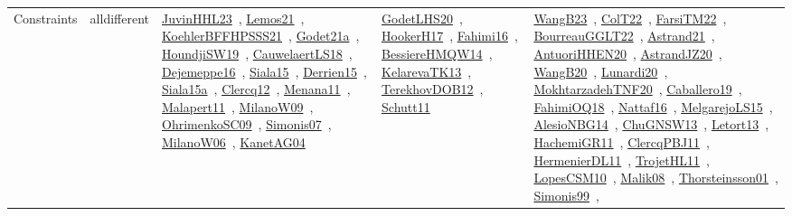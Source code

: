 {\begin{longtable}{lp{3cm}>{\raggedright\arraybackslash}p{6cm}>{\raggedright\arraybackslash}p{6cm}>{\raggedright\arraybackslash}p{8cm}}
Constraints & alldifferent & \href{../works/JuvinHHL23.pdf}{JuvinHHL23}~\cite{JuvinHHL23}, \href{../works/Lemos21.pdf}{Lemos21}~\cite{Lemos21}, \href{../works/KoehlerBFFHPSSS21.pdf}{KoehlerBFFHPSSS21}~\cite{KoehlerBFFHPSSS21}, \href{../works/Godet21a.pdf}{Godet21a}~\cite{Godet21a}, \href{../works/HoundjiSW19.pdf}{HoundjiSW19}~\cite{HoundjiSW19}, \href{../works/CauwelaertLS18.pdf}{CauwelaertLS18}~\cite{CauwelaertLS18}, \href{../works/Dejemeppe16.pdf}{Dejemeppe16}~\cite{Dejemeppe16}, \href{../works/Siala15.pdf}{Siala15}~\cite{Siala15}, \href{../works/Derrien15.pdf}{Derrien15}~\cite{Derrien15}, \href{../works/Siala15a.pdf}{Siala15a}~\cite{Siala15a}, \href{../works/Clercq12.pdf}{Clercq12}~\cite{Clercq12}, \href{../works/Menana11.pdf}{Menana11}~\cite{Menana11}, \href{../works/Malapert11.pdf}{Malapert11}~\cite{Malapert11}, \href{../works/MilanoW09.pdf}{MilanoW09}~\cite{MilanoW09}, \href{../works/OhrimenkoSC09.pdf}{OhrimenkoSC09}~\cite{OhrimenkoSC09}, \href{../works/Simonis07.pdf}{Simonis07}~\cite{Simonis07}, \href{../works/MilanoW06.pdf}{MilanoW06}~\cite{MilanoW06}, \href{../works/KanetAG04.pdf}{KanetAG04}~\cite{KanetAG04} & \href{../works/GodetLHS20.pdf}{GodetLHS20}~\cite{GodetLHS20}, \href{../works/HookerH17.pdf}{HookerH17}~\cite{HookerH17}, \href{../works/Fahimi16.pdf}{Fahimi16}~\cite{Fahimi16}, \href{../works/BessiereHMQW14.pdf}{BessiereHMQW14}~\cite{BessiereHMQW14}, \href{../works/KelarevaTK13.pdf}{KelarevaTK13}~\cite{KelarevaTK13}, \href{../works/TerekhovDOB12.pdf}{TerekhovDOB12}~\cite{TerekhovDOB12}, \href{../works/Schutt11.pdf}{Schutt11}~\cite{Schutt11} & \href{../works/WangB23.pdf}{WangB23}~\cite{WangB23}, \href{../works/ColT22.pdf}{ColT22}~\cite{ColT22}, \href{../works/FarsiTM22.pdf}{FarsiTM22}~\cite{FarsiTM22}, \href{../works/BourreauGGLT22.pdf}{BourreauGGLT22}~\cite{BourreauGGLT22}, \href{../works/Astrand21.pdf}{Astrand21}~\cite{Astrand21}, \href{../works/AntuoriHHEN20.pdf}{AntuoriHHEN20}~\cite{AntuoriHHEN20}, \href{../works/AstrandJZ20.pdf}{AstrandJZ20}~\cite{AstrandJZ20}, \href{../works/WangB20.pdf}{WangB20}~\cite{WangB20}, \href{../works/Lunardi20.pdf}{Lunardi20}~\cite{Lunardi20}, \href{../works/MokhtarzadehTNF20.pdf}{MokhtarzadehTNF20}~\cite{MokhtarzadehTNF20}, \href{../works/Caballero19.pdf}{Caballero19}~\cite{Caballero19}, \href{../works/FahimiOQ18.pdf}{FahimiOQ18}~\cite{FahimiOQ18}, \href{../works/Nattaf16.pdf}{Nattaf16}~\cite{Nattaf16}, \href{../works/MelgarejoLS15.pdf}{MelgarejoLS15}~\cite{MelgarejoLS15}, \href{../works/AlesioNBG14.pdf}{AlesioNBG14}~\cite{AlesioNBG14}, \href{../works/ChuGNSW13.pdf}{ChuGNSW13}~\cite{ChuGNSW13}, \href{../works/Letort13.pdf}{Letort13}~\cite{Letort13}, \href{../works/HachemiGR11.pdf}{HachemiGR11}~\cite{HachemiGR11}, \href{../works/ClercqPBJ11.pdf}{ClercqPBJ11}~\cite{ClercqPBJ11}, \href{../works/HermenierDL11.pdf}{HermenierDL11}~\cite{HermenierDL11}, \href{../works/TrojetHL11.pdf}{TrojetHL11}~\cite{TrojetHL11}, \href{../works/LopesCSM10.pdf}{LopesCSM10}~\cite{LopesCSM10}, \href{../works/Malik08.pdf}{Malik08}~\cite{Malik08}, \href{../works/Thorsteinsson01.pdf}{Thorsteinsson01}~\cite{Thorsteinsson01}, \href{../works/Simonis99.pdf}{Simonis99}~\cite{Simonis99}, 
\end{longtable}}
